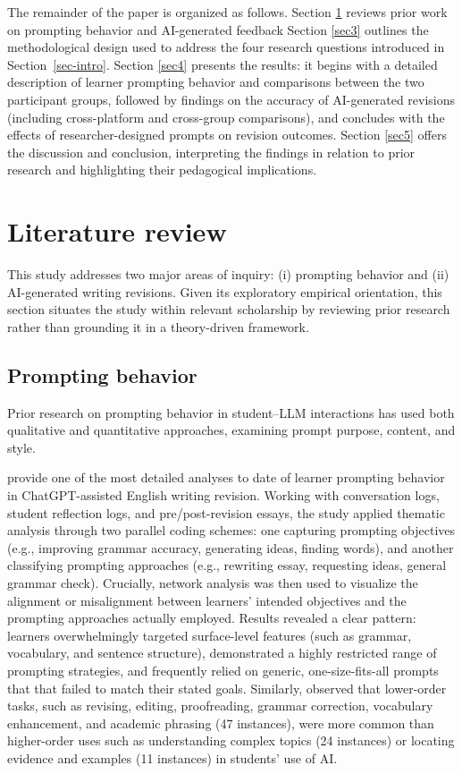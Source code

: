 \documentclass[english]{textolivre}
\begin{document}
The remainder of the paper is organized as follows.
Section \ref{sec2} reviews prior work on prompting behavior and AI-generated feedback
Section \ref{sec3} outlines the methodological design used to address the four research questions introduced in Section~\ref{sec-intro}.
Section \ref{sec4} presents the results: it begins with a detailed description of learner prompting behavior and comparisons between the two participant groups, followed by findings on the accuracy of AI-generated revisions (including cross-platform and cross-group comparisons), and concludes with the effects of researcher-designed prompts on revision outcomes.
Section \ref{sec5} offers the discussion and conclusion, interpreting the findings in relation to prior research and highlighting their pedagogical implications.

\section{Literature review}\label{sec2}

This study addresses two major areas of inquiry: (i) prompting behavior and (ii) AI-generated writing revisions. Given its exploratory empirical orientation, this section situates the study within relevant scholarship by reviewing prior research rather than grounding it in a theory-driven framework.

\subsection{Prompting behavior}

Prior research on prompting behavior in student–LLM interactions has used both qualitative and quantitative approaches, examining prompt purpose, content, and style.

\textcite{hwang2024exploring} provide one of the most detailed analyses to date of learner prompting behavior in ChatGPT-assisted English writing revision. Working with conversation logs, student reflection logs, and pre/post-revision essays, the study applied thematic analysis through two parallel coding schemes: one capturing prompting objectives (e.g., improving grammar accuracy, generating ideas, finding words), and another classifying prompting approaches (e.g., rewriting essay, requesting ideas, general grammar check). Crucially, network analysis was then used to visualize the alignment or misalignment between learners' intended objectives and the prompting approaches actually employed. Results revealed a clear pattern: learners overwhelmingly targeted surface-level features (such as grammar, vocabulary, and sentence structure), demonstrated a highly restricted range of prompting strategies, and frequently relied on generic, one-size-fits-all prompts that that failed to match their stated goals. Similarly, \textcite{Black} observed that lower-order tasks, such as revising, editing, proofreading, grammar correction, vocabulary enhancement, and academic phrasing (47 instances), were more common than higher-order uses such as understanding complex topics (24 instances) or locating evidence and examples (11 instances) in students' use of AI.
\end{document}
